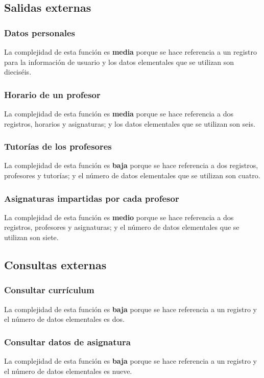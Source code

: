 \documentclass[11pt,a4paper,spanish,twoside]{book}
\begin{document}
\subsection{Salidas externas}
\subsubsection{Datos personales}
La complejidad de esta función es \textbf{media} porque se hace referencia a
un registro para la información de usuario y los datos elementales que se
utilizan son dieciséis.

\subsubsection{Horario de un profesor}
La complejidad de esta función es \textbf{media} porque se hace referencia a
dos registros, horarios y asignaturas; y los datos elementales que
se utilizan son seis.

\subsubsection{Tutorías de los profesores} 
La complejidad de esta función es \textbf{baja} porque se hace referencia a
dos registros, profesores y tutorías; y el número de datos elementales que se
utilizan son cuatro. 

\subsubsection{Asignaturas impartidas por cada profesor}
La complejidad de esta función es \textbf{medio} porque se hace referencia a
dos registros, profesores y asignaturas; y el número de datos elementales que se
utilizan son siete. 

\subsection{Consultas externas}
\subsubsection{Consultar currículum}
La complejidad de esta función es \textbf{baja} porque se hace referencia a
un registro y el número de datos elementales es dos.

\subsubsection{Consultar datos de asignatura} 
La complejidad de esta función es \textbf{baja} porque se hace referencia a
un registro y el número de datos elementales es nueve.
\end{document}
